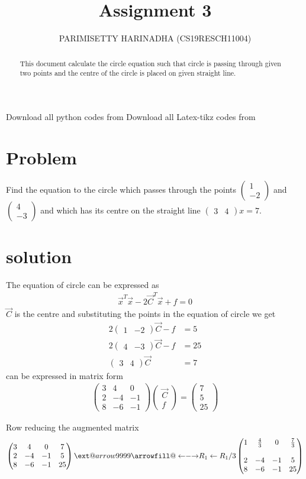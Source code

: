 \documentclass[journal,12pt,twocolumn]{IEEEtran}
\title{Assignment 3}
\author{PARIMISETTY HARINADHA (CS19RESCH11004)}
\makeatletter
\newcommand\xleftrightarrow[2][]{%
  \ext@arrow 9999{\longleftrightarrowfill@}{#1}{#2}}
\newcommand\longleftrightarrowfill@{%
  \arrowfill@\leftarrow\relbar\rightarrow}
\newcommand{\myvec}[1]{\ensuremath{\begin{pmatrix}#1\end{pmatrix}}}
\makeatother
\begin{document}
\maketitle
\newpage
\begin{abstract}
This document calculate the circle equation such that circle is passing through given two points and the centre of the circle is placed on given straight line.
\end{abstract}
Download all python codes from 
Download all Latex-tikz codes from 
\section{Problem}
Find the equation to the circle which passes through the points $\myvec{ 1 \\ -2 }$ and $\myvec{ 4 \\ -3 }$ and which has its centre on the straight line $\myvec{ 3 & 4 }x = 7$.
\section{solution}
The equation of circle can be expressed as
\begin{align}
    \vec{x}^T\vec{x}-2\vec{C}^T\vec{x}+f = 0
\end{align}
$\vec{C}$ is the centre  and substituting the points in the equation of circle we get
\begin{align}
2\myvec{1 & -2}\vec{C}-f &= 5\\
2\myvec{4 & -3}\vec{C}-f &= 25\\
\myvec{3 & 4}\vec{C} &= 7
\end{align}
can be expressed in matrix form
\begin{align}
\myvec{3 & 4 & 0 \\
2 & -4 & -1 \\
8 & -6 & -1}
\myvec{\vec{C}\\f} = \myvec{ 7 \\ 5 \\ 25}
\end{align}

Row reducing the augmented matrix
\begin{align}
\myvec{3 & 4 & 0 & 7\\
2 & -4 & -1 & 5 \\
8 & -6 & -1 & 25}
\xleftrightarrow{R_1\leftarrow R_1/3}
\myvec{1 & \frac{4}{3} & 0 & \frac{7}{3}\\ \\
2 & -4 & -1 & 5 \\ 
8 & -6 & -1 & 25}
\end{align}
\end{document}
